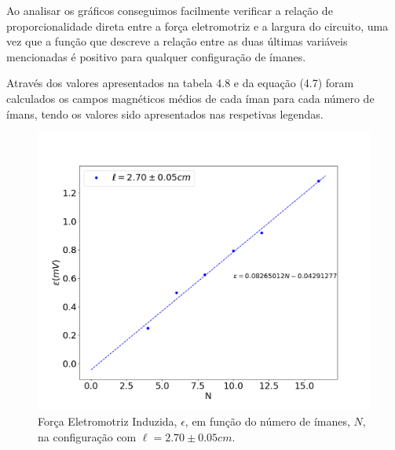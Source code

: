 \documentclass[11pt]{report}
\begin{document}
	Ao analisar os gráficos conseguimos facilmente verificar a relação de proporcionalidade direta entre a força eletromotriz e a largura do circuito, uma vez que a função que descreve a relação entre as duas últimas variáveis mencionadas é positivo para qualquer configuração de ímanes.

	Através dos valores apresentados na tabela 4.8 e da equação (4.7) foram calculados os campos magnéticos médios de cada íman para cada número de ímans, tendo os valores sido apresentados nas respetivas legendas.


\begin{figure}[H]
	\center
	\includegraphics[scale=0.35]{bporimaneslconstante.png}
	\caption{Força Eletromotriz Induzida, $\epsilon$, em função do número de ímanes, $N$, na configuração com $\ell=2.70\pm0.05cm$.}
	\label{}
\end{figure}
\end{document}
